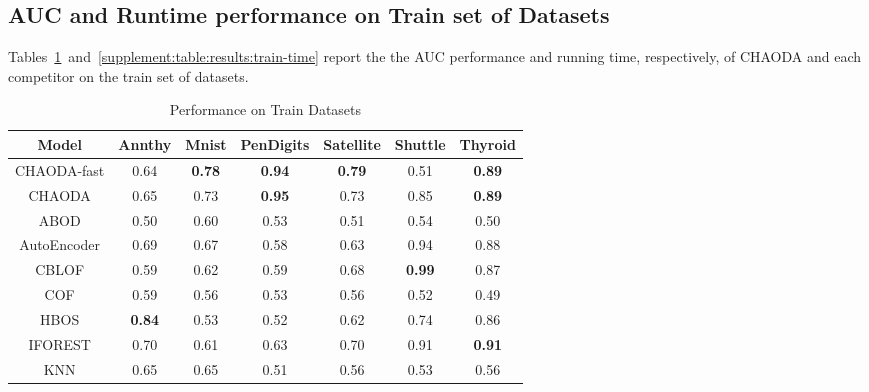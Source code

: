 \subsection{AUC and Runtime performance on Train set of Datasets}

Tables~\ref{supplement:table:results:train-performance}~and~\ref{supplement:table:results:train-time} report the  the AUC performance and running time, respectively, of CHAODA and each competitor on the train set of datasets.

\begin{table}[!t]
\renewcommand{\arraystretch}{1.25}
\caption{Performance on Train Datasets}
\label{supplement:table:results:train-performance}
\vskip 0.15in
\begin{center}
\begin{small}
\begin{tabular}{|c|c|c|c|c|c|c|}
\hline
\textbf{Model} & \textbf{Annthy} & \textbf{Mnist} & \textbf{PenDigits} & \textbf{Satellite} & \textbf{Shuttle} & \textbf{Thyroid} \\
\hline
CHAODA-fast &                0.64 &  \textbf{0.78} &      \textbf{0.94} &      \textbf{0.79} &             0.51 &    \textbf{0.89} \\
\hline
CHAODA &                0.65 &           0.73 &      \textbf{0.95} &               0.73 &             0.85 &    \textbf{0.89} \\
\hline
ABOD &                0.50 &           0.60 &               0.53 &               0.51 &             0.54 &             0.50 \\
\hline
AutoEncoder &                0.69 &           0.67 &               0.58 &               0.63 &             0.94 &             0.88 \\
\hline
CBLOF &                0.59 &           0.62 &               0.59 &               0.68 &    \textbf{0.99} &             0.87 \\
\hline
COF &                0.59 &           0.56 &               0.53 &               0.56 &             0.52 &             0.49 \\
\hline
HBOS &       \textbf{0.84} &           0.53 &               0.52 &               0.62 &             0.74 &             0.86 \\
\hline
IFOREST &                0.70 &           0.61 &               0.63 &               0.70 &             0.91 &    \textbf{0.91} \\
\hline
KNN &                0.65 &           0.65 &               0.51 &               0.56 &             0.53 &             0.56 \\

\end{tabular}
\end{small}
\end{center}
\end{table}
